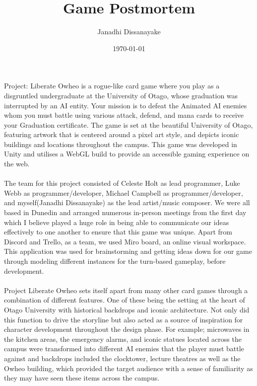 \documentclass[a4paper]{article}
\title{\textbf{Game Postmortem}}
\author{Janadhi Dissanayake}
\date{\today}
\begin{document}
\vspace{-1.5em} 
\maketitle
\thispagestyle{fancy}
Project: Liberate Owheo is a rogue-like card game where you play as a disgruntled undergraduate at the University of Otago, whose graduation was interrupted by an AI entity. Your mission is to defeat the Animated AI enemies whom you must battle using various attack, defend, and mana cards to receive your Graduation certificate. The game is set at the beautiful University of Otago, featuring artwork that is centered around a pixel art style, and depicts iconic buildings and locations throughout the campus. This game was developed in Unity and utilises a WebGL build to provide an accessible gaming experience on the web. 
\\\\
The team for this project consisted of Celeste Holt as lead programmer, Luke Webb as programmer/developer, Michael Campbell as programmer/developer, and myself(Janadhi Dissanayake) as the lead artist/music composer. We were all based in Dunedin and arranged numerous in-person meetings from the first day which I believe played a huge role in being able to communicate our ideas effectively to one another to ensure that this game was unique. Apart from Discord and Trello, as a team, we used Miro board, an online visual workspace. This application was used for brainstorming and getting ideas down for our game through modeling different instances for the turn-based gameplay, before development.
\\\\
Project Liberate Owheo sets itself apart from many other card games through a combination of different features. One of these being the setting at the heart of Otago University with historical backdrops and iconic architecture. Not only did this function to drive the storyline but also acted as a source of inspiration for character development throughout the design phase. For example; microwaves in the kitchen areas, the emergency alarms, and iconic statues located across the campus were transformed into different AI enemies that the player must battle against and backdrops included the clocktower, lecture theatres as well as the Owheo building, which provided the target audience with a sense of familiarity as they may have seen these items across the campus.
\\\\
\end{document}
